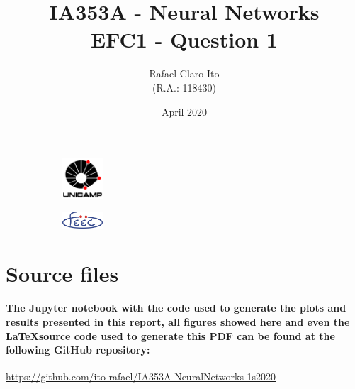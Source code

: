 \documentclass[a4paper]{article}    %
\begin{document}
\begin{figure}
    \centering
    \begin{subfigure}{0.45\textwidth}
        \centering
        \includegraphics[width=1.5cm]{unicamp}
    \end{subfigure}
    \hfill
    \begin{subfigure}{0.45\textwidth}
        \centering
        \includegraphics[width=1.5cm]{feec}
    \end{subfigure}
\end{figure}

\title{
    \vspace{5cm}
    IA353A - Neural Networks\\
    EFC1 - Question 1
    \vspace{1cm}
}
\author{
    Rafael Claro Ito\\
    (R.A.: 118430)
    \vspace{11cm}
}
\date{April 2020}
\maketitle
\newpage

\section{Source files}

\paragraph{The Jupyter notebook with the code used to generate the plots and results presented in this report, all figures showed here and even the \LaTeX \space source code used to generate this PDF can be found at the following GitHub repository:}

\begin{center}
    {\url{https://github.com/ito-rafael/IA353A-NeuralNetworks-1s2020}}
\end{center}
\end{document}
